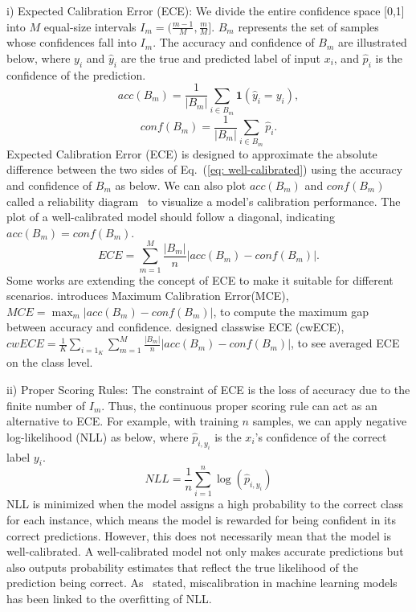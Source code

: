 i) Expected Calibration Error (ECE):
We divide the entire confidence space [0,1] into $M$ equal-size intervals $I_m = (\frac{m-1}{M},\frac{m}{M}]$. $B_m$ represents the set of samples whose confidences fall into $I_m$. The accuracy and confidence of $B_m$ are illustrated below, where $y_i$ and $\hat{y}_i$ are the true and predicted label of input $x_i$, and $\hat{p}_i$ is the confidence of the prediction.
\begin{equation}
    acc(B_m)=\frac{1}{|B_m|}\sum_{i\in B_m}\textbf{1}(\hat{y}_i=y_i),
\end{equation}
\begin{equation}
    conf(B_m)=\frac{1}{|B_m|}\sum_{i\in B_m}\hat{p}_i.
\end{equation}
Expected Calibration Error (ECE) is designed to approximate the absolute difference between the two sides of Eq.~(\ref{eq: well-calibrated}) using the accuracy and confidence of $B_m$ as below. We can also plot $acc(B_m)$ and $conf(B_m)$ called a reliability diagram~\cite{niculescu2005predicting} to visualize a model's calibration performance. The plot of a well-calibrated model should follow a diagonal, indicating $acc(B_m)=conf(B_m)$.
\begin{equation}
    ECE=\sum_{m=1}^M\frac{|B_m|}{n}|acc(B_m)-conf(B_m)|.
\end{equation}
Some works are extending the concept of ECE to make it suitable for different scenarios. \cite{naeini2015obtaining} introduces Maximum Calibration Error(MCE), $MCE=\max_m|acc(B_m)-conf(B_m)|$, to compute the maximum gap between accuracy and confidence. \cite{kull2019beyond} designed classwise ECE (cwECE), $cwECE=\frac{1}{K}\sum_{i=1}_K\sum_{m=1}^M\frac{|B_m|}{n}|acc(B_m)-conf(B_m)|$, to see averaged ECE on the class level.

ii) Proper Scoring Rules: The constraint of ECE is the loss of accuracy due to the finite number of $I_m$. Thus, the continuous proper scoring rule can act as an alternative to ECE. For example, with training $n$ samples, we can apply negative log-likelihood (NLL) as below, where $\hat{p}_{i,y_i}$ is the $x_i$'s confidence of the correct label $y_i$. 
\begin{equation}
    NLL=\frac{1}{n}\sum_{i=1}^n \log(\hat{p}_{i,y_i})
\end{equation}
NLL is minimized when the model assigns a high probability to the correct class for each instance, which means the model is rewarded for being confident in its correct predictions. However, this does not necessarily mean that the model is well-calibrated. A well-calibrated model not only makes accurate predictions but also outputs probability estimates that reflect the true likelihood of the prediction being correct. As~\cite{krishnan2020improving,mukhoti2020calibrating} stated, miscalibration in machine learning models has been linked to the overfitting of NLL.

